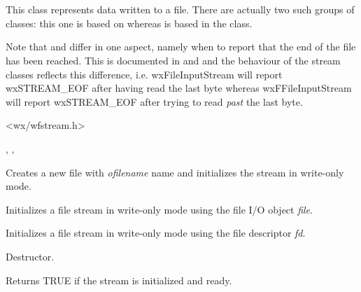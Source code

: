 \section{}\label{wxfileoutputstream}

This class represents data written to a file. There are actually
two such groups of classes: this one is based on  
whereas  is based in
the  class.

Note that  and  differ
in one aspect, namely when to report that the end of the file has been
reached. This is documented in  and 
 and the behaviour of the stream
classes reflects this difference, i.e. wxFileInputStream will report
wxSTREAM\_EOF after having read the last byte whereas wxFFileInputStream
will report wxSTREAM\_EOF after trying to read {\it past} the last byte.




<wx/wfstream.h>


, , 




Creates a new file with {\it ofilename} name and initializes the stream in
write-only mode. 


Initializes a file stream in write-only mode using the file I/O object {\it file}.


Initializes a file stream in write-only mode using the file descriptor {\it fd}.



Destructor.



Returns TRUE if the stream is initialized and ready.

